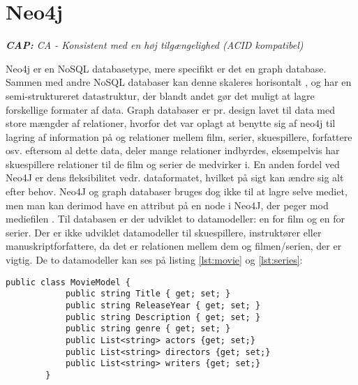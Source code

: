 \section{Neo4j}
\begin{displayquote}
    \textit{\textbf{CAP:} CA - Konsistent med en høj tilgængelighed (ACID kompatibel)}
\end{displayquote}
Neo4j er en NoSQL databasetype, mere specifikt er det en graph database. Sammen med andre NoSQL databaser kan denne skaleres horisontalt \cite{graphfacelift}, og har en semi-struktureret datastruktur, der blandt andet gør det muligt at lagre forskellige formater af data. Graph databaser er pr. design lavet til data med store mængder af relationer, hvorfor det var oplagt at benytte sig af neo4j til lagring af information på og relationer mellem film, serier, skuespillere, forfattere osv. eftersom al dette data, deler mange relationer indbyrdes, eksempelvis har skuespillere relationer til de film og serier de medvirker i. En anden fordel ved Neo4J er dens fleksibilitet vedr. dataformatet, hvilket på sigt kan ændre sig alt efter behov. Neo4J og graph databaser bruges dog ikke til at lagre selve mediet, men man kan derimod have en attribut på en node i Neo4J, der peger mod mediefilen \cite{graphmediafiles}.
\bigbreak
Til databasen er der udviklet to datamodeller: en for film og en for serier. Der er ikke udviklet datamodeller til skuespillere, instruktører eller manuskriptforfattere, da det er relationen mellem dem og filmen/serien, der er vigtig. De to datamodeller kan ses på listing \ref{lst:movie} og \ref{lst:series}:

\begin{tcolorbox}
    \lstset{style=sharpstyle}
    \begin{lstlisting}[language={[Sharp]C}, caption={C\# MovieModel Class}, label={lst:movie}]
        public class MovieModel {
            public string Title { get; set; }
            public string ReleaseYear { get; set; }
            public string Description { get; set; }
            public string genre { get; set; }
            public List<string> actors {get; set;}
            public List<string> directors {get; set;}
            public List<string> writers {get; set;}
        }
    \end{lstlisting}
\end{tcolorbox}

